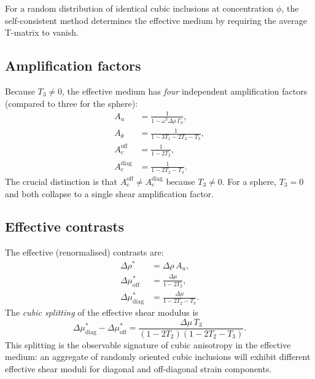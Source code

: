 \documentclass[11pt,a4paper]{article}
\newcommand{\Dmu}{\Delta\mu}
\newcommand{\Drho}{\Delta\rho}
\begin{document}
For a random distribution of identical cubic inclusions at
concentration $\phi$, the self-consistent method
\citep{ZellerDederichs1973,Willis1981} determines the effective
medium by requiring the average T-matrix to vanish.

\subsection{Amplification factors}

Because $T_3 \neq 0$, the effective medium has \emph{four}
independent amplification factors (compared to three for the
sphere):
\begin{align}
  A_u &= \frac{1}{1 - \omega^2\Drho\,\Gamma_0},
  \label{eq:Au} \\[6pt]
  A_\theta &= \frac{1}{1 - 3T_1 - 2T_2 - T_3},
  \label{eq:Atheta} \\[6pt]
  A_e^\text{off} &= \frac{1}{1 - 2T_2},
  \label{eq:Aeoff} \\[6pt]
  A_e^\text{diag} &= \frac{1}{1 - 2T_2 - T_3}.
  \label{eq:Aediag}
\end{align}
The crucial distinction is that
$A_e^\text{off} \neq A_e^\text{diag}$ because $T_3 \neq 0$.
For a sphere, $T_3 = 0$ and both collapse to a single shear
amplification factor.

\subsection{Effective contrasts}

The effective (renormalised) contrasts are:
\begin{align}
  \Drho^* &= \Drho\,A_u, \label{eq:Drhost} \\
  \Dmu_\text{off}^* &= \frac{\Dmu}{1 - 2T_2},
  \label{eq:Dmuoff} \\
  \Dmu_\text{diag}^* &= \frac{\Dmu}{1 - 2T_2 - T_3}.
  \label{eq:Dmudiag}
\end{align}
The \emph{cubic splitting} of the effective shear modulus is
\begin{equation}
  \boxed{
  \Dmu_\text{diag}^* - \Dmu_\text{off}^*
  = \frac{\Dmu\,T_3}{(1 - 2T_2)(1 - 2T_2 - T_3)}.
  }
  \label{eq:splitting}
\end{equation}
This splitting is the observable signature of cubic anisotropy
in the effective medium: an aggregate of randomly oriented cubic
inclusions will exhibit different effective shear moduli for
diagonal and off-diagonal strain components.

\end{document}
